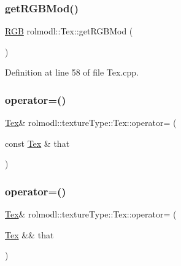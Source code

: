 \subsubsection{\texorpdfstring{getRGBMod()}{getRGBMod()}}
{\footnotesize\ttfamily \mbox{\hyperlink{structrolmodl_1_1_r_g_b}{R\+GB}} rolmodl\+::\+Tex\+::get\+R\+G\+B\+Mod (\begin{DoxyParamCaption}{ }\end{DoxyParamCaption})}



Definition at line 58 of file Tex.\+cpp.

\mbox{\label{classrolmodl_1_1texture_type_1_1_tex_a6ef09877eb963104ec08eb30146e09c6}} 
\subsubsection{\texorpdfstring{operator=()}{operator=()}\hspace{0.1cm}{\footnotesize\ttfamily [1/2]}}
{\footnotesize\ttfamily \mbox{\hyperlink{classrolmodl_1_1texture_type_1_1_tex}{Tex}}\& rolmodl\+::texture\+Type\+::\+Tex\+::operator= (\begin{DoxyParamCaption}\item[{const \mbox{\hyperlink{classrolmodl_1_1texture_type_1_1_tex}{Tex}} \&}]{that }\end{DoxyParamCaption})\hspace{0.3cm}{\ttfamily [delete]}}

\mbox{\label{classrolmodl_1_1texture_type_1_1_tex_a59f81e276beb53804578f59863c47c34}} 
\subsubsection{\texorpdfstring{operator=()}{operator=()}\hspace{0.1cm}{\footnotesize\ttfamily [2/2]}}
{\footnotesize\ttfamily \mbox{\hyperlink{classrolmodl_1_1texture_type_1_1_tex}{Tex}}\& rolmodl\+::texture\+Type\+::\+Tex\+::operator= (\begin{DoxyParamCaption}\item[{\mbox{\hyperlink{classrolmodl_1_1texture_type_1_1_tex}{Tex}} \&\&}]{that }\end{DoxyParamCaption})\hspace{0.3cm}{\ttfamily [noexcept]}}

